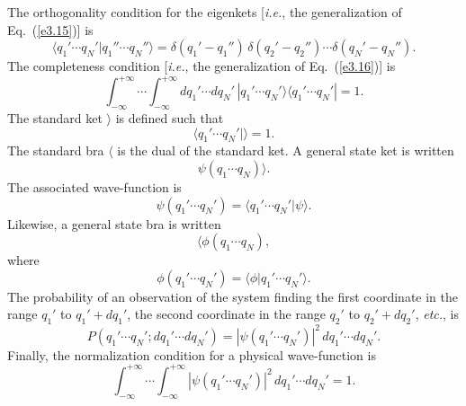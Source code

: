 The orthogonality condition for the eigenkets [{\em i.e.}, the generalization of
Eq.~(\ref{e3.15})] is
\begin{equation}
\langle q_1'\cdots q_N'| q_1''\cdots q_N''\rangle = \delta(q_1'-q_1'')\,\delta(q_2'-q_2'')\cdots
\delta(q_N'-q_N'').
\end{equation}
The completeness condition [{\em i.e.}, the generalization of Eq.~(\ref{e3.16})] is
\begin{equation}
\int_{-\infty}^{+\infty} \cdots\int_{-\infty}^{+\infty} dq_1' \cdots dq_N'\,
|q_1'\cdots q_N'\rangle \langle q_1'\cdots q_N'| = 1.
\end{equation}
The standard ket $\rangle$ is defined such that
\begin{equation}\label{e3.50}
\langle q_1'\cdots q_N'|\rangle = 1.
\end{equation}
The standard bra $\langle$ is the dual of the standard ket. A general state 
ket is written
\begin{equation}
\psi(q_1\cdots q_N)\rangle.
\end{equation}
The associated wave-function is
\begin{equation}
\psi(q_1'\cdots q_N') = \langle q_1'\cdots q_N'|\psi\rangle.
\end{equation}
Likewise, a general state bra is written
\begin{equation}
\langle \phi(q_1\cdots q_N),
\end{equation}
where
\begin{equation}
\phi(q_1'\cdots q_N') = \langle \phi|q_1'\cdots q_N'\rangle.
\end{equation}
The probability of an observation of the system finding the first coordinate in
the range $q_1'$ to $q_1'+dq_1'$, the second coordinate in the range $q_2'$ to $q_2'
+dq_2'$, {\em etc.}, is
\begin{equation}
P(q_1'\cdots q_N'; dq_1'\cdots dq_N') = |\psi(q_1'\cdots q_N')|^2\,dq_1'\cdots 
dq_N'.
\end{equation}
Finally, the normalization condition for a physical wave-function is
\begin{equation}
\int_{-\infty}^{+\infty} \cdots \int_{-\infty}^{+\infty}
|\psi(q_1'\cdots q_N')|^2\,dq_1'\cdots dq_N' = 1.
\end{equation}

